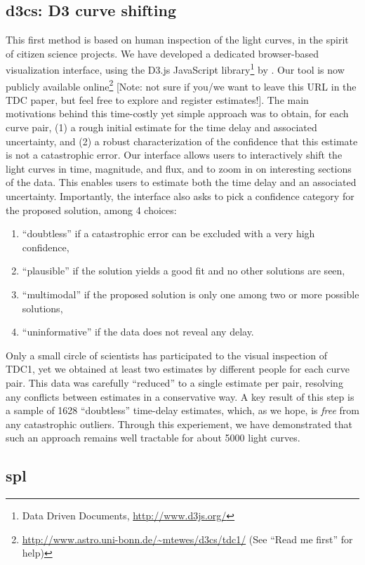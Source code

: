 \documentclass[traditabstract]{aa}
\begin{document}
\subsection{d3cs: D3 curve shifting}
This first method is based on human inspection of the light curves, in the spirit of citizen science projects. We have developed a dedicated browser-based visualization interface, using the D3.js JavaScript library\footnote{Data Driven Documents, \url{http://www.d3js.org/}} by \citet{d3}. Our tool is now publicly available online\footnote{\url{http://www.astro.uni-bonn.de/~mtewes/d3cs/tdc1/} (See ``Read me first'' for help)} [Note: not sure if you/we want to leave this URL in the TDC paper, but feel free to explore and register estimates!]. The main motivations behind this time-costly yet simple approach was to obtain, for each curve pair, (1) a rough initial estimate for the time delay and associated uncertainty, and (2) a robust characterization of the confidence that this estimate is not a catastrophic error. Our interface allows users to interactively shift the light curves in time, magnitude, and flux, and to zoom in on interesting sections of the data. This enables users to estimate both the time delay and an associated uncertainty. Importantly, the interface also asks to pick a confidence category for the proposed solution, among 4 choices:
\begin{enumerate}
\item ``doubtless'' if a catastrophic error can be excluded with a very high confidence,
\item ``plausible'' if the solution yields a good fit and no other solutions are seen,
\item ``multimodal'' if the proposed solution is only one among two or more possible solutions,
\item ``uninformative'' if the data does not reveal any delay.
\end{enumerate}
Only a small circle of scientists has participated to the visual inspection of TDC1, yet we obtained at least two estimates by different people for each curve pair. This data was carefully ``reduced'' to a single estimate per pair, resolving any conflicts between estimates in a conservative way. A key result of this step is a sample of 1628 ``doubtless'' time-delay estimates, which, as we hope, is \emph{free} from any catastrophic outliers. Through this experiement, we have demonstrated that such an approach remains well tractable for about 5000 light curves.

\subsection{spl}
\end{document}
